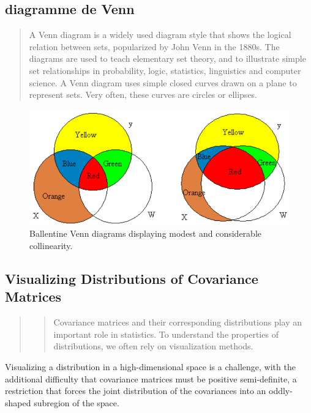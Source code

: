 \documentclass[
]{report}
\begin{document}
\hypertarget{diagramme-de-venn}{%
\subsection{diagramme de Venn}\label{diagramme-de-venn}}

\begin{quote}
A Venn diagram is a widely used diagram style that shows the logical relation between sets, popularized by John Venn in the 1880s. The diagrams are used to teach elementary set theory, and to illustrate simple set relationships in probability, logic, statistics, linguistics and computer science. A Venn diagram uses simple closed curves drawn on a plane to represent sets. Very often, these curves are circles or ellipses.
\end{quote}

\begin{figure}
    \centering
    \includegraphics[width= 250 pt]{venn_colinearity.PNG}
    \caption{Ballentine Venn diagrams displaying modest and considerable collinearity.}
    \label{fig:my_label}
\end{figure}

\hypertarget{visualizing-distributions-of-covariance-matrices}{%
\subsection{Visualizing Distributions of Covariance Matrices}\label{visualizing-distributions-of-covariance-matrices}}

\begin{quote}
\begin{quote}
Covariance matrices and their corresponding distributions play an important role in statistics. To understand the properties of distributions, we often rely on visualization methods. \citep{VisCov}
\end{quote}
\end{quote}

Visualizing a distribution in a high-dimensional space is a challenge, with the additional
difficulty that covariance matrices must be positive semi-definite, a restriction that forces
the joint distribution of the covariances into an oddly-shaped subregion of the space.
\end{document}
